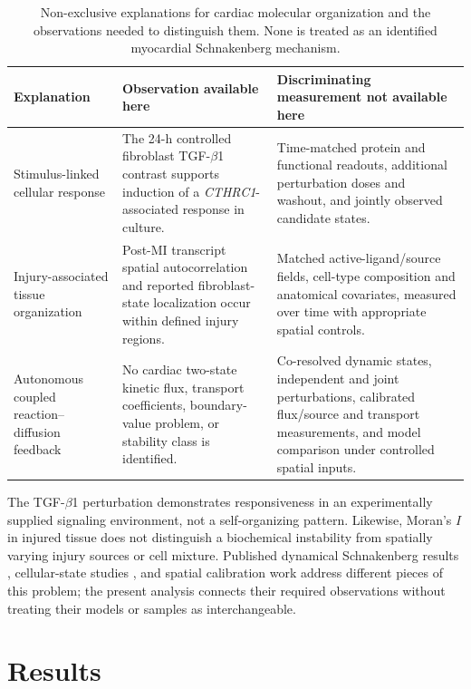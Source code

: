 \documentclass[preprint,11pt]{elsarticle}
\newcommand{\cthrc}{\textit{CTHRC1}}
\newcommand{\tgfb}{TGF-$\beta$1}
\begin{document}
\begin{table}[!htbp]
\centering
\caption{Non-exclusive explanations for cardiac molecular organization and the observations needed to distinguish them. None is treated as an identified myocardial Schnakenberg mechanism.}
\label{tab:mechanisms}
\small
\begin{tabularx}{\linewidth}{p{3.15cm}YY}
\toprule
\textbf{Explanation} & \textbf{Observation available here} & \textbf{Discriminating measurement not available here}\\
\midrule
Stimulus-linked cellular response & The 24-h controlled fibroblast \tgfb{} contrast supports induction of a \cthrc{}-associated response in culture. & Time-matched protein and functional readouts, additional perturbation doses and washout, and jointly observed candidate states.\\
Injury-associated tissue organization & Post-MI transcript spatial autocorrelation and reported fibroblast-state localization occur within defined injury regions. & Matched active-ligand/source fields, cell-type composition and anatomical covariates, measured over time with appropriate spatial controls.\\
Autonomous coupled reaction--diffusion feedback & No cardiac two-state kinetic flux, transport coefficients, boundary-value problem, or stability class is identified. & Co-resolved dynamic states, independent and joint perturbations, calibrated flux/source and transport measurements, and model comparison under controlled spatial inputs.\\
\bottomrule
\end{tabularx}
\end{table}

The TGF-$\beta$1 perturbation demonstrates responsiveness in an experimentally supplied signaling environment, not a self-organizing pattern. Likewise, Moran's $I$ in injured tissue does not distinguish a biochemical instability from spatially varying injury sources or cell mixture. Published dynamical Schnakenberg results \cite{Alfifi2022,Jiang2019,Sargood2022}, cellular-state studies \cite{RuizVillalba2020,Hernandez2026,Wang2023}, and spatial calibration work \cite{Daher2026} address different pieces of this problem; the present analysis connects their required observations without treating their models or samples as interchangeable.

\section{Results}
\end{document}
